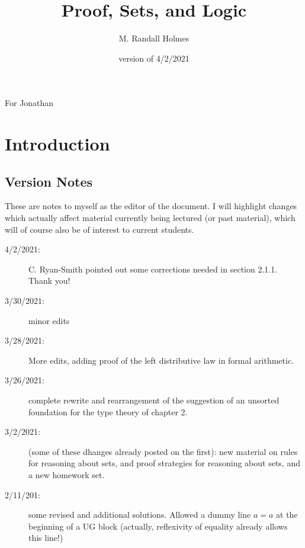 \documentclass[12pt]{book}
\title{Proof, Sets, and Logic}
\author{M. Randall Holmes}
\date{version of 4/2/2021}
\begin{document}
\maketitle

\newpage

\begin{centering}
For Jonathan\\
\end{centering}

\newpage

\tableofcontents

\newpage

\section{Introduction}

{\tiny

\subsection{Version Notes}

These are notes to myself as the editor of the document.  I will
highlight changes which actually affect material currently being
lectured (or past material), which will of course also be of interest
to current students.

\begin{description}

\item[4/2/2021:]  C. Ryan-Smith pointed out some corrections needed in section 2.1.1.  Thank you!

\item[3/30/2021:]  minor edits

\item[3/28/2021:]  More edits, adding proof of the left distributive law in formal arithmetic.

\item[3/26/2021:]  complete rewrite and rearrangement of the suggestion of an unsorted foundation for the type theory of chapter 2.

\item[3/2/2021:]  (some of these dhanges already posted on the first):  new material on rules for reasoning about sets, and proof strategies for reasoning about sets, and a new homework set.

\item[2/11/201:]  some revised and additional solutions.  Allowed a dummy line $a=a$ at the beginning of a UG block (actually, reflexivity of equality already allows this line!)


\end{description}}
\end{document}
